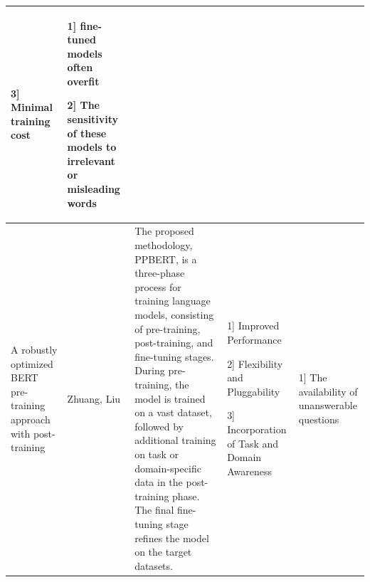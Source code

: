 \documentclass[conference]{IEEEtran}
\begin{document}
\begin{table}
\begin{center}
\begin{tabular}{ |p{2cm}|p{2cm}|p{4cm}|p{3cm}|p{4cm}| }
3] Minimal training cost  & 1] fine-tuned models often overfit

2] The sensitivity of these models to irrelevant or misleading words
\\
\hline
[25] A robustly optimized BERT pre-training approach with post-training & Zhuang, Liu & The proposed methodology, PPBERT, is a three-phase process for training language models, consisting of pre-training, post-training, and fine-tuning stages. During pre-training, the model is trained on a vast dataset, followed by additional training on task or domain-specific data in the post-training phase. The final fine-tuning stage refines the model on the target datasets. &  1] Improved Performance

2] Flexibility and Pluggability

3] Incorporation of Task and Domain Awareness & 1] The availability of unanswerable questions


\end{tabular}
\end{center}
\end{table}
\end{document}
